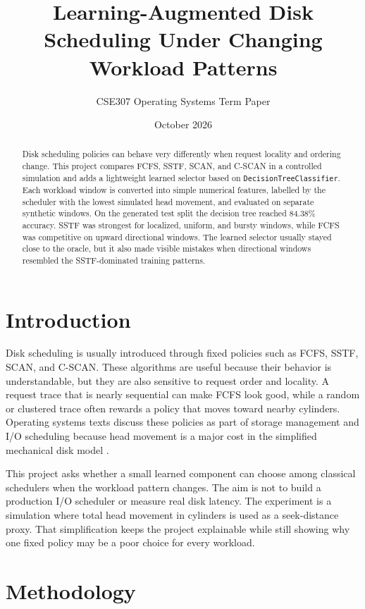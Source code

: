 \documentclass[11pt,a4paper]{article}
\title{Learning-Augmented Disk Scheduling Under Changing Workload Patterns}
\author{CSE307 Operating Systems Term Paper}
\date{October 2026}
\begin{document}
\maketitle

\begin{abstract}
Disk scheduling policies can behave very differently when request locality and ordering change. This project compares FCFS, SSTF, SCAN, and C-SCAN in a controlled simulation and adds a lightweight learned selector based on \texttt{DecisionTreeClassifier}. Each workload window is converted into simple numerical features, labelled by the scheduler with the lowest simulated head movement, and evaluated on separate synthetic windows. On the generated test split the decision tree reached 84.38\% accuracy. SSTF was strongest for localized, uniform, and bursty windows, while FCFS was competitive on upward directional windows. The learned selector usually stayed close to the oracle, but it also made visible mistakes when directional windows resembled the SSTF-dominated training patterns.
\end{abstract}

\section{Introduction}
Disk scheduling is usually introduced through fixed policies such as FCFS, SSTF, SCAN, and C-SCAN. These algorithms are useful because their behavior is understandable, but they are also sensitive to request order and locality. A request trace that is nearly sequential can make FCFS look good, while a random or clustered trace often rewards a policy that moves toward nearby cylinders. Operating systems texts discuss these policies as part of storage management and I/O scheduling because head movement is a major cost in the simplified mechanical disk model \cite{silberschatz2018osc,arpacidusseau2018ostep}.

This project asks whether a small learned component can choose among classical schedulers when the workload pattern changes. The aim is not to build a production I/O scheduler or measure real disk latency. The experiment is a simulation where total head movement in cylinders is used as a seek-distance proxy. That simplification keeps the project explainable while still showing why one fixed policy may be a poor choice for every workload.

\section{Methodology}
\end{document}
